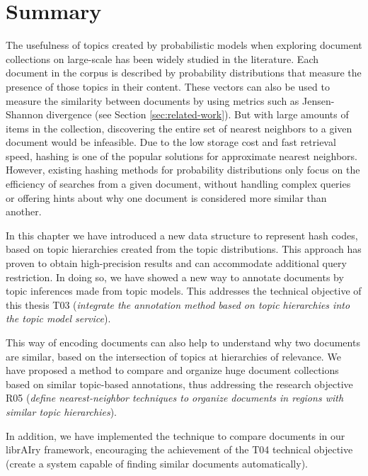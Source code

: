 \section{Summary}

The usefulness of topics created by probabilistic models when exploring document collections on large-scale has been widely studied in the literature. Each document in the corpus is described by probability distributions that measure the presence of those topics in their content. These vectors can also be used to measure the similarity between documents by using metrics such as Jensen-Shannon divergence (see Section \ref{sec:related-work}). But with large amounts of items in the collection, discovering the entire set of nearest neighbors to a given document would be infeasible. Due to the low storage cost and fast retrieval speed, hashing is one of the popular solutions for approximate nearest neighbors. However, existing hashing methods for probability distributions only focus on the efficiency of searches from a given document, without handling complex queries or offering hints about why one document is considered more similar than another. 

In this chapter we have introduced a new data structure to represent hash codes, based on topic  hierarchies created from the topic distributions. This approach has proven to obtain high-precision results and can accommodate additional query restriction. In doing so, we have showed a new way to annotate documents by topic inferences made from topic models. This addresses the technical objective of this thesis T03 (\textit{integrate the annotation method based on topic hierarchies into the topic model service}).

This way of encoding documents can also help to understand why two documents are similar, based on the intersection of topics at hierarchies of relevance. We have proposed a method to compare and organize huge document collections based on similar topic-based annotations, thus addressing the research objective R05 (\textit{define nearest-neighbor techniques to organize documents in regions with similar topic hierarchies}).

In addition, we have implemented the technique to compare documents in our librAIry framework, encouraging the achievement of the T04 technical objective (create a system capable of finding similar documents automatically).
